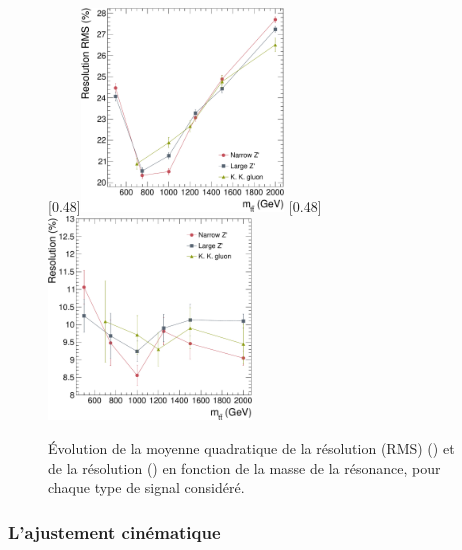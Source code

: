 \begin{figure}[tbp] \centering
    \subcaptionbox{\label{fig:rms_zprime}}[0.48\textwidth]{\includegraphics[width=0.48\textwidth]{chapitre7/figs/signal_rms_vs_mtt.pdf}} \hfill
    \subcaptionbox{\label{fig:reso_zprime}}[0.48\textwidth]{\includegraphics[width=0.48\textwidth]{chapitre7/figs/signal_reso_vs_mtt.pdf}}
    \caption{Évolution de la moyenne quadratique de la résolution (RMS) () et de la résolution () en fonction de la masse de la résonance, pour chaque type de signal considéré.}
    \label{fig:rms_reso_zprime}
\end{figure}

\subsubsection{L'ajustement cinématique}

